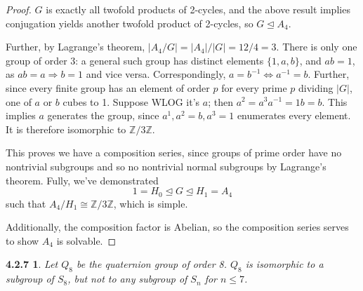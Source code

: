 \documentclass{article}
\newcommand{\nsub}{\trianglelefteq}
\newtheorem*{4.2.7}{4.2.7}
\begin{document}
\begin{proof}
  $G$ is exactly all twofold products of 2-cycles, and the above result implies conjugation yields another twofold product of 2-cycles, so $G \nsub A_{4}$.

  Further, by Lagrange's theorem, $|A_{4} / G| = |A_{4}| / |G| = 12 / 4 = 3$.
  There is only one group of order 3: a general such group has distinct elements $\{1, a, b\}$, and $ab = 1$, as $ab = a \Rightarrow b = 1$ and vice versa.
  Correspondingly, $a = b^{-1} \Leftrightarrow a^{-1} = b$.
  Further, since every finite group has an element of order $p$ for every prime $p$ dividing $|G|$, one of $a$ or $b$ cubes to 1.
  Suppose WLOG it's $a$; then $a^{2} = a^{3}a^{-1} = 1b = b$.
  This implies $a$ generates the group, since $a^{1}, a^{2} = b, a^{3} = 1$ enumerates every element.
  It is therefore isomorphic to $\mathbb{Z} / 3\mathbb{Z}$.

  This proves we have a composition series, since groups of prime order have no nontrivial subgroups
  and so no nontrivial normal subgroups by Lagrange's theorem.
  Fully, we've demonstrated
  \[
    1 = H_{0} \nsub G \nsub H_{1} = A_{4}
  \]
  such that $A_{4} / H_{1} \cong \mathbb{Z} / 3\mathbb{Z}$, which is simple.

  Additionally, the composition factor is Abelian, so the composition series serves to show $A_{4}$ is solvable.
\end{proof}

\begin{4.2.7}
  Let $Q_{8}$ be the quaternion group of order 8.
  $Q_{8}$ is isomorphic to a subgroup of $S_{8}$, but not to any subgroup of $S_{n}$ for $n \leq 7$.
\end{4.2.7}
\end{document}
